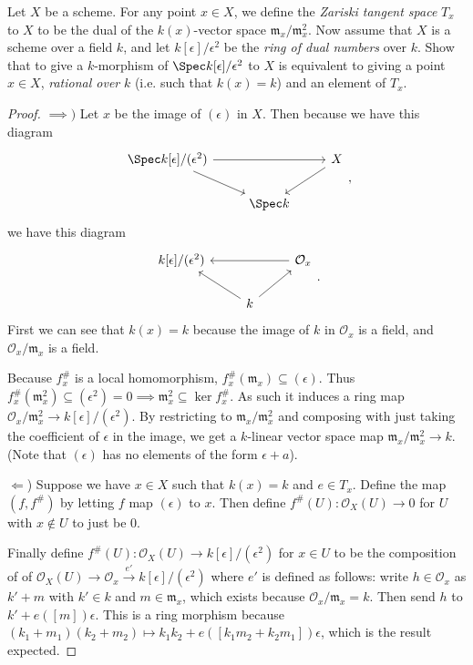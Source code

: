 \begin{exercise}%
	Let $X$	be a scheme. For any point $x\in X $, we define the \textit{Zariski tangent space} $T_x $ to $X $ to be the dual of the $k(x) $-vector space $\mathfrak{m}_x / \mathfrak{m}_x^2 $. Now assume that $X $ is a scheme over a field $k $, and let $k[\epsilon] / \epsilon^2$ be the \textit{ring of dual numbers} over $k $. Show that to give a $k $-morphism of $\Spec k[\epsilon] / \epsilon^2 $ to $X $ is equivalent to giving a point $x\in X $, \textit{rational over} $k $ (i.e. such that $k(x) = k $) and an element of $T_x $.
\end{exercise}
\begin{proof}
	$\implies) $
	Let $x $ be the image of $(\epsilon) $ in $X $.
	Then because we have this diagram
	\[
	\begin{tikzcd}
		\Spec k[\epsilon]/(\epsilon^2) & & X\\
	 & \Spec k &
	\arrow[from=1-1,to=1-3]
	\arrow[from=1-1,to=2-2]
	\arrow[from=1-3,to=2-2]
	\end{tikzcd},
	\]
	we have this diagram
	\[
	\begin{tikzcd}
		k[\epsilon] / (\epsilon^2) & & \mathcal{O}_x\\
	 & k &
	\arrow[from=1-3,to=1-1]
	\arrow[from=2-2,to=1-1]
	\arrow[from=2-2,to=1-3]
	\end{tikzcd}.
	\]
	First we can see that $k(x) = k $ because the image of $k $ in $\mathcal{O}_x $ is a field, and $\mathcal{O}_x / \mathfrak{m}_x $ is a field.

	Because $f^\#_x $ is a local homomorphism, $f^\#_x(\mathfrak{m}_x) \subseteq (\epsilon) $.
	Thus $f^\#_x(\mathfrak{m}_x^2) \subseteq (\epsilon^2) = 0 \implies \mathfrak{m}_x^2 \subseteq \ker f^\#_x $.
	As such it induces a ring map $\mathcal{O}_x / \mathfrak{m}^2_x \to k[\epsilon] / (\epsilon^2)$.
	By restricting to $\mathfrak{m}_x / \mathfrak{m}_x^2 $ and composing with just taking the coefficient of $\epsilon $ in the image, we get a $k $-linear vector space map $\mathfrak{m}_x / \mathfrak{m}_x^2 \to k $.
	(Note that $(\epsilon) $ has no elements of the form $\epsilon+a $).

	$\Leftarrow $) Suppose we have $x \in X $ such that $k(x) = k $ and $e \in T_x $. 
	Define the map $(f,f^\#) $ by letting $f $ map $(\epsilon) $ to $x $.
	Then define $f^\#(U): \mathcal{O}_X(U) \to 0$ for $U$ with $x\notin U $ to just be 0.

	Finally define $f^\#(U): \mathcal{O}_X(U) \to k[\epsilon] / (\epsilon^2) $ for $x\in U $ to be the composition of of $\mathcal{O}_X(U) \to \mathcal{O}_x \xrightarrow{e'} k[\epsilon] / (\epsilon^2)$ where $e' $ is defined as follows:
	write $h \in \mathcal{O}_x $ as $k' + m $ with $k' \in k $ and $m \in \mathfrak{m}_x $, which exists because $\mathcal{O}_x / \mathfrak{m}_x = k $.
	Then send $h $ to $k' + e([m])\epsilon$.
	This is a ring morphism because $(k_{1}+m_{1})(k_{2}+m_{2}) \mapsto k_{1}k_{2} + e([k_{1}m_{2}+k_{2}m_{1}])\epsilon $, which is the result expected.
\end{proof}

